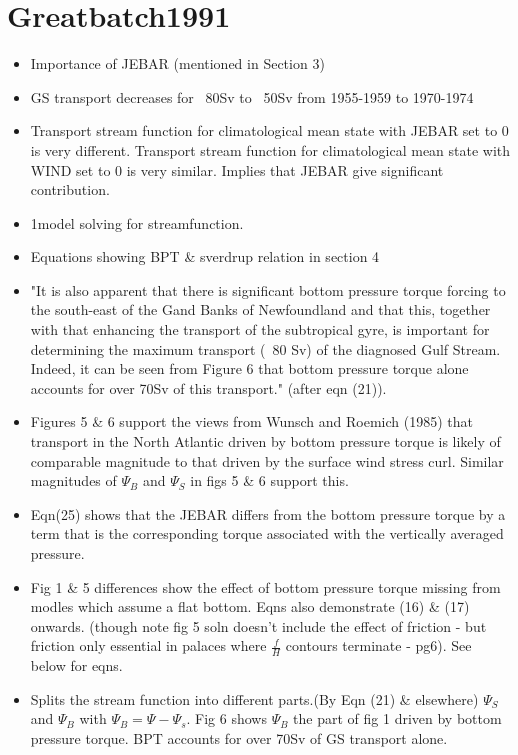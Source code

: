 \documentclass[..\Papers.tex]{subfiles}
\begin{document}
\section{Greatbatch1991}
\citep{Greatbatch1991}


\begin{itemize}
    \item Importance of JEBAR (mentioned in Section 3)
    \item GS transport decreases for ~80Sv to ~50Sv from 1955-1959 to 1970-1974
    \item Transport stream function for climatological mean state with JEBAR set to 0 is very different. Transport stream function for climatological mean state with WIND set to 0 is very similar. Implies that JEBAR give significant contribution.
    \item 1\degree model solving for streamfunction.
    \item Equations showing BPT \& sverdrup relation in section 4
    \item "It is also apparent that there is significant bottom pressure torque forcing to the south-east of the Gand Banks of Newfoundland and that this, together with that enhancing the transport of the subtropical gyre, is important for determining the maximum transport (~80 Sv) of the diagnosed Gulf Stream. Indeed, it can be seen from Figure 6 that bottom pressure torque alone accounts for over 70Sv of this transport." (after eqn (21)).
    \item Figures 5 \& 6 support the views from Wunsch and Roemich (1985) that transport in the North Atlantic driven by bottom pressure torque is likely of comparable magnitude to that driven by the surface wind stress curl. Similar magnitudes of $\Psi_B$ and $\Psi_S$ in figs 5 \& 6 support this.
    \item Eqn(25) shows that the JEBAR differs from the bottom pressure torque by a term that is the corresponding torque associated with the vertically averaged pressure.
    \item Fig 1 \& 5 differences show the effect of bottom pressure torque missing from modles which assume a flat bottom. Eqns also demonstrate (16) \& (17) onwards.  (though note fig 5 soln doesn't include the effect of friction - but friction only essential in palaces where $\frac{f}{H}$ contours terminate - pg6). See below for eqns.
    \item Splits the stream function into different parts.(By Eqn (21) \& elsewhere) $\Psi_S$ and $\Psi_B$ with $\Psi_B = \Psi - \Psi_s$. Fig 6 shows $\Psi_B$ the part of fig 1 driven by bottom pressure torque. BPT accounts for over 70Sv of GS transport alone.

\end{itemize}
\end{document}
